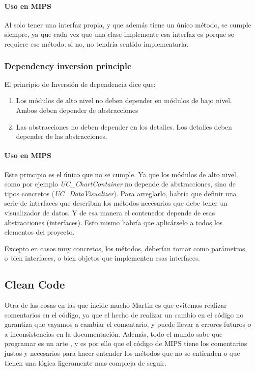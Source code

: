 \paragraph{Uso en MIPS}
Al solo tener una interfaz propia, y que adem\'as tiene un \'unico m\'etodo, se cumple siempre, ya que
cada vez que una clase implemente esa interfaz es porque se requiere ese m\'etodo, si no, no tendr\'ia sentido
implementarla.

\subsubsection{Dependency inversion principle}
El principio de Inversi\'{o}n de dependencia \cite{SOLID:DIP} dice que:
\begin{enumerate}
    \item Los m\'{o}dulos de alto nivel no deben depender en m\'{o}dulos de bajo nivel. Ambos deben depender de abstracciones
    \item Las abstracciones no deben depender en los detalles. Los detalles deben depender de las abstracciones.
\end{enumerate}

\paragraph{Uso en MIPS}
Este principio es el \'unico que no se cumple. Ya que los m\'odulos de alto nivel, como por ejemplo
\emph{UC\_ChartContainer} no depende de abstracciones, sino de tipos concretos (\emph{UC\_DataVisualizer}).
Para arreglarlo, habr\'ia que definir una serie de interfaces que describan los m\'etodos necesarios que 
debe tener un visualizador de datos. Y de esa manera el contenedor depende de esas abstracciones (interfaces).
Esto mismo habr\'ia que aplic\'arselo a todos los elementos del proyecto.

Excepto en casos muy concretos, los m\'etodos, deber\'ian tomar como par\'ametros, o bien interfaces, o bien
objetos que implementen esas interfaces.

\subsection{Clean Code}
Otra de las cosas en las que incide mucho Martin es que evitemos realizar comentarios en el c\'odigo,
ya que el hecho de realizar un cambio en el c\'odigo no garantiza que vayamos a cambiar el comentario, y 
puede llevar a errores futuros o a inconsistencias en la documentaci\'on. Adem\'as, todo el mundo sabe que programar
es un arte \cite{Art:Programming}, y es por ello que el c\'odigo de MIPS tiene los comentarios justos y necesarios
para hacer entender los m\'etodos que no se entienden o que tienen una l\'ogica ligeramente mas compleja de seguir.

